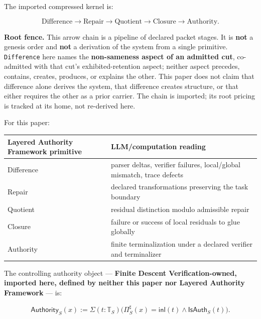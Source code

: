 \documentclass[
  10pt,
]{article}
\DeclareRobustCommand{\texttt}[1]{{\paperSymbolFont\nolinkurl{#1}}}
\begin{document}
The imported compressed kernel is:

\protect\hypertarget{math-E0006-0007}{}{\[
\boxed{
\text{Difference}\to\text{Repair}\to\text{Quotient}\to\text{Closure}\to\text{Authority}.
}
\]}

\textbf{Root fence.} This arrow chain is a pipeline of declared packet stages. It is \textbf{not} a genesis order and \textbf{not} a derivation of the system from a single primitive. \texttt{Difference} here names the \textbf{non-sameness aspect of an admitted cut}, co-admitted with that cut's exhibited-retention aspect; neither aspect precedes, contains, creates, produces, or explains the other. This paper does not claim that difference alone derives the system, that difference creates structure, or that either requires the other as a prior carrier. The chain is imported; its root pricing is tracked at its home, not re-derived here.

For this paper:

\begin{longtable}[]{@{}
  >{\raggedright\arraybackslash}p{}
  >{\raggedright\arraybackslash}p{}@{}}
\toprule\noalign{}
\begin{minipage}[b]{\linewidth}\raggedright
Layered Authority Framework primitive
\end{minipage} & \begin{minipage}[b]{\linewidth}\raggedright
LLM/computation reading
\end{minipage} \\
\midrule\noalign{}
\endhead
\bottomrule\noalign{}
\endlastfoot
Difference & parser deltas, verifier failures, local/global mismatch, trace defects \\
Repair & declared transformations preserving the task boundary \\
Quotient & residual distinction modulo admissible repair \\
Closure & failure or success of local residuals to glue globally \\
Authority & finite terminalization under a declared verifier and terminalizer \\
\end{longtable}

The controlling authority object --- \textbf{Finite Descent Verification-owned, imported here, defined by neither this paper nor Layered Authority Framework} --- is:

\protect\hypertarget{math-E0007-0008}{}{\[
\boxed{
\mathsf{Authority}_S(x)
:=
\Sigma(t:\mathbb T_S)
\bigl(
\Pi_S^\sharp(x)=\mathsf{inl}(t)
\wedge
\mathsf{IsAuth}_S(t)
\bigr).
}
\]}
\end{document}
